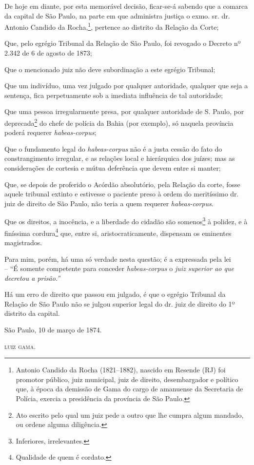De hoje em diante, por esta memorável decisão, ficar-se-á sabendo que a
comarca da capital de São Paulo, na parte em que administra justiça o
exmo. sr. dr. Antonio Candido da Rocha,\footnote{ Antonio Candido da
  Rocha (1821--1882), nascido em Resende (RJ) foi promotor público, juiz
  municipal, juiz de direito, desembargador e político que, à época da
  demissão de Gama do cargo de amanuense da Secretaria de Polícia,
  exercia a presidência da província de São Paulo.}, pertence ao
distrito da Relação da Corte;

Que, pelo egrégio Tribunal da Relação de São Paulo, foi revogado o
Decreto nº 2.342 de 6 de agosto de 1873;

Que o mencionado juiz não deve subordinação a este egrégio Tribunal;

Que um indivíduo, uma vez julgado por qualquer autoridade, qualquer que
seja a sentença, fica perpetuamente sob a imediata influência de tal
autoridade;

Que uma pessoa irregularmente presa, por qualquer autoridade de S.
Paulo, por deprecada\footnote{ Ato escrito pelo qual um juiz pede a
  outro que lhe cumpra algum mandado, ou ordene alguma diligência.} do
chefe de polícia da Bahia (por exemplo), só naquela província poderá
requerer \emph{habeas-corpus};

Que o fundamento legal do \emph{habeas-corpus} não é a justa cessão do
fato do constrangimento irregular, e as relações local e hierárquica dos
juízes; mas as considerações de cortesia e mútua deferência que devem
entre si manter;

Que, se depois de proferido o Acórdão absolutório, pela Relação da
corte, fosse aquele tribunal extinto e estivesse o paciente preso à
ordem do meritíssimo dr. juiz de direito de São Paulo, não teria a quem
requerer \emph{habeas-corpus}.

Que os direitos, a inocência, e a liberdade do cidadão são
somenos\footnote{ Inferiores, irrelevantes.} à polidez, e à finíssima
cordura\footnote{ Qualidade de quem é cordato.} que, entre si,
aristocraticamente, dispensam os eminentes magistrados.

Para mim, porém, há uma só verdade nesta questão; é a expressada pela
lei\\
-- ``É somente competente para conceder \emph{habeas-corpus} o \emph{juiz
superior ao que decretou a prisão.''}

Há um erro de direito que passou em julgado, é que o egrégio Tribunal da
Relação de São Paulo não se julgou superior legal do dr. juiz de direito
do 1º distrito da capital.
\begin{flushright}
São Paulo, 10 de março de 1874.

\textsc{luiz gama}.
\end{flushright}
